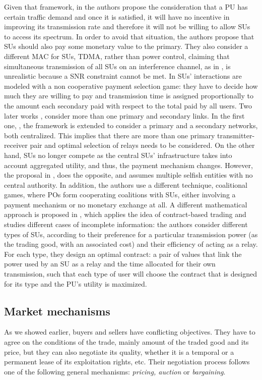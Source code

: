 Given that framework, in \cite{ref:Zhang2009} the authors propose the consideration that a PU has certain traffic demand and once it is satisfied, it will have no incentive in improving its transmission rate and therefore it will not be willing to allow SUs to access its spectrum. In order to avoid that situation, the authors propose that SUs should also pay some monetary value to the primary. They also consider a different MAC for SUs, TDMA, rather than power control, claiming that simultaneous transmission of all SUs on an interference channel, as in \cite{ref:Simeone2008}, is unrealistic because a SNR constraint cannot be met. In \cite{ref:Zhang2009}  SUs' interactions are modeled with a non cooperative payment selection game: they have to decide how much they are willing to pay and transmission time is assigned proportionally to the amount each secondary paid with respect to the total paid by all users. Two later works \cite{ref:Yi2010,ref:Li2011}, consider more than one primary and secondary links. 
In the first one, \cite{ref:Yi2010}, the framework is extended to consider a primary and a secondary networks, both centralized. This implies that there are more than one primary transmitter-receiver pair and optimal selection of relays needs to be considered. On the other hand, SUs no longer compete as the central SUs' infrastructure takes into account aggregated utility, and thus, the payment mechanism changes. 
However, the proposal in \cite{ref:Li2011}, does the opposite, and assumes multiple selfish entities with no central authority. In addition, the authors use a different technique, coalitional games, where POs form cooperating coalitions with SUs, either involving a payment mechanism or no monetary exchange at all. A different mathematical approach is proposed in \cite{ref:Duan2011_Contract}, which applies the idea of contract-based trading and studies different cases of incomplete information: the authors consider different types of SUs, according to their preference for a particular transmission power (as the trading good, with an associated cost) and their efficiency of acting as a relay. For each type, they design an optimal contract: a pair of values that link the power used by an SU as a relay and the time allocated for their own transmission, such that each type of user will choose the contract that is designed for its type and the PU's utility is maximized. 

\subsection{Market mechanisms}
\label{subsec:Market}
As we showed earlier, buyers and sellers have conflicting objectives. They have to agree on the conditions of the trade, mainly amount of the traded good and its price, but they can also negotiate its quality, whether it is a temporal or a permanent lease of its exploitation rights, etc. Their negotiation process follows one of the following general mechanisms: \textit{pricing, auction} or \textit{bargaining}. 
	
